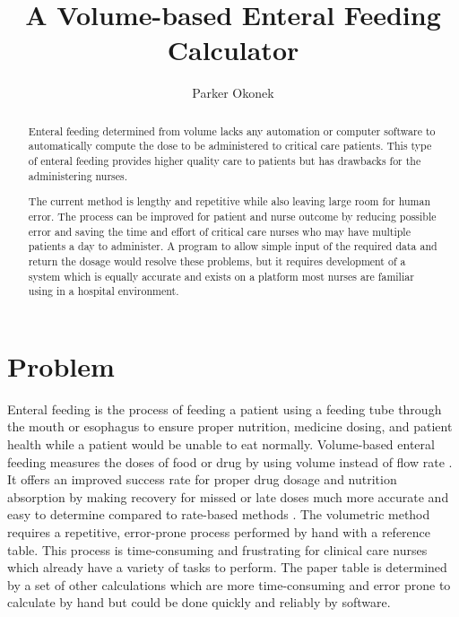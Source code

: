 \documentclass[10pt,draftclsnofoot,onecolumn]{IEEEtran}
\begin{document}
\title{A Volume-based Enteral Feeding Calculator}
\author{Parker Okonek}
\maketitle
\begin{abstract}
Enteral feeding determined from volume lacks any automation or computer software to
automatically compute the dose to be administered to critical care patients.
This type of enteral feeding provides higher quality care to patients but has drawbacks for
the administering nurses.

The current method is lengthy and repetitive while also leaving large room for human error.
The process can be improved for patient and nurse outcome by reducing possible error and 
saving the time and effort of critical care nurses who may have multiple patients a day to
administer. A program to allow simple input of the required data and return the dosage would
resolve these problems, but it requires development of a system which is equally accurate
and exists on a platform most nurses are familiar using in a hospital environment.
\end{abstract}
\newpage
\section{Problem}
Enteral feeding is the process of feeding a patient using a feeding tube through the 
mouth or esophagus to ensure proper nutrition, medicine dosing, and patient health while
a patient would be unable to eat normally. 
Volume-based enteral feeding measures the doses of food or drug by using volume instead of
flow rate . It offers an improved success rate for proper drug dosage
 and nutrition absorption  by making recovery for missed or late doses
 much more accurate and easy to determine compared to rate-based methods \autocite{whiteking}.
The volumetric method requires a repetitive, error-prone process performed by hand with
a reference table. This process is time-consuming and frustrating for clinical care nurses which
already have a variety of tasks to perform.  The paper table is determined by a set of other 
calculations which are more time-consuming and error prone to calculate by hand but could
be done quickly and reliably by software.
\end{document}
